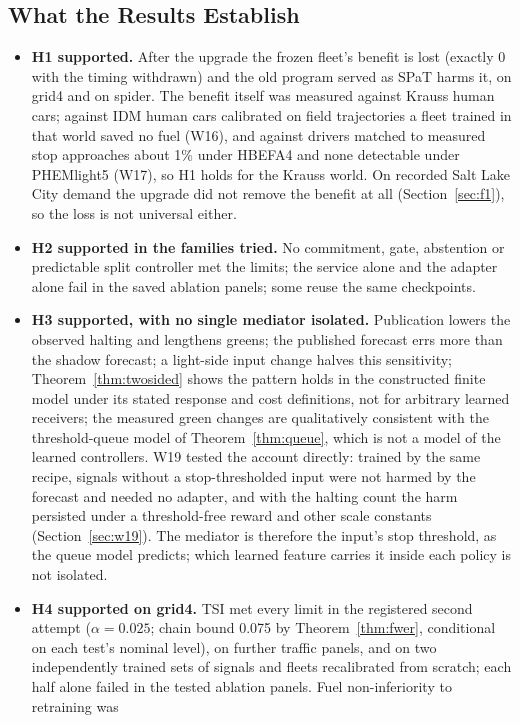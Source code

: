 \subsection{What the Results Establish}
\begin{itemize}\setlength\itemsep{1pt}
\item \textbf{H1 supported.} After the upgrade the frozen fleet's benefit is lost (exactly 0 with the timing withdrawn) and the old program
served as SPaT harms it, on grid4 and on spider. The benefit itself was measured against Krauss human cars; against IDM human cars
calibrated on field trajectories a fleet trained in that world saved no fuel (W16), and against drivers matched to measured stop approaches
about 1\% under HBEFA4 and none detectable under PHEMlight5 (W17), so H1 holds for the Krauss world. On recorded
Salt Lake City demand the upgrade did not remove the benefit at all (Section~\ref{sec:f1}), so the loss is not universal either.
\item \textbf{H2 supported in the families tried.} No commitment, gate, abstention or predictable split controller met the limits; the
service alone and the adapter alone fail in the saved ablation panels; some reuse the same checkpoints.
\item \textbf{H3 supported, with no single mediator isolated.} Publication lowers the observed halting and lengthens greens; the published
forecast errs more than the shadow forecast; a light-side input change halves this sensitivity; Theorem~\ref{thm:twosided} shows the
pattern holds in the constructed finite model under its stated response and cost definitions, not for arbitrary learned receivers; the measured green changes are qualitatively consistent with the threshold-queue model of
Theorem~\ref{thm:queue}, which is not a model of the learned controllers. W19 tested the account directly: trained by the same recipe,
signals without a stop-thresholded input were not harmed by the forecast and needed no adapter, and with the halting count the harm
persisted under a threshold-free reward and other scale constants (Section~\ref{sec:w19}). The mediator is therefore the input's stop
threshold, as the queue model predicts; which learned feature carries it inside each policy is not isolated.
\item \textbf{H4 supported on grid4.} TSI met every limit in the registered second attempt ($\alpha=0.025$; chain bound 0.075 by
Theorem~\ref{thm:fwer}, conditional on each test's nominal level), on further traffic panels, and on two independently trained sets of
signals and fleets recalibrated from scratch; each half alone failed in the tested ablation panels. Fuel non-inferiority to retraining was

\end{itemize}
